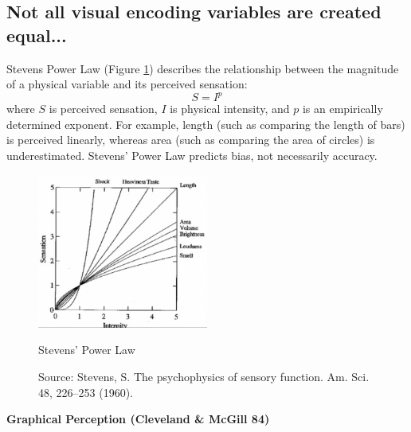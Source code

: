 \subsection{Not all visual encoding variables are created equal...}
Stevens Power Law (Figure \ref{fig:stevens_power_law}) describes the relationship between the magnitude of a physical variable and its perceived sensation:
\begin{equation}
S = I^p
\end{equation}
where $S$ is perceived sensation, $I$ is physical intensity, and $p$ is an empirically determined exponent. For example, length (such as comparing the length of bars) is perceived linearly, whereas area (such as comparing the area of circles) is underestimated. Stevens' Power Law predicts bias, not necessarily accuracy.
\begin{figure}[ht]
	\begin{center}
		\includegraphics[width=0.5\textwidth]{figures/stevens_power_law.png}
		\caption{
			Stevens' Power Law}
		\caption*{Source: Stevens, S. The psychophysics of sensory function. Am. Sci. 48, 226–253 (1960).}
		\label{fig:stevens_power_law}
	\end{center}
\end{figure} 
\newline
\textbf{Graphical Perception (Cleveland \& McGill 84)}
